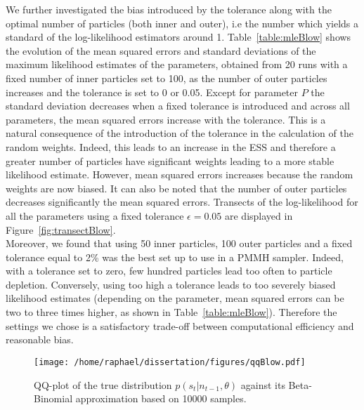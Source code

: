\documentclass[12pt]{article}
\begin{document}
	We further investigated the bias introduced by the tolerance along with the optimal number of particles (both inner and outer), i.e the number which yields a standard of the log-likelihood estimators around 1. Table~\ref{table:mleBlow} shows the evolution of the mean squared errors and standard deviations of the maximum likelihood estimates of the parameters, obtained from 20 runs with a fixed number of inner particles set to 100, as the number of outer particles increases and the tolerance is set to 0 or 0.05. Except for parameter $P$ the standard deviation decreases when a fixed tolerance is introduced and across all parameters, the mean squared errors increase with the tolerance. This is a natural consequence of the introduction of the tolerance in the calculation of the random weights. Indeed, this leads to an increase in the ESS and therefore a greater number of particles have significant weights leading to a more stable likelihood estimate. However, mean squared errors increases because the random weights are now biased. It can also be noted that the number of outer particles decreases significantly the mean squared errors.
	Transects of the log-likelihood for all the parameters using a fixed tolerance $\epsilon=0.05$ are displayed in Figure~\ref{fig:transectBlow}. \\
	Moreover, we found that using 50 inner particles, 100 outer particles and a fixed tolerance equal to 2\% was the best set up to use in a PMMH sampler. Indeed, with a tolerance set to zero, few hundred particles lead too often to particle depletion. Conversely, using too high a tolerance leads to too severely biased likelihood estimates (depending on the parameter, mean squared errors can be two to three times higher, as shown in Table~\ref{table:mleBlow}). Therefore the settings we chose is a satisfactory trade-off between computational efficiency and reasonable bias.

	\begin{figure}[htb]
		\centering
		\begin{minipage}{0.9\textwidth}
			\centering
			\texttt{[image: /home/raphael/dissertation/figures/qqBlow.pdf]}
		\end{minipage}
		\caption[QQ-plot of the true distribution $p(s_t | n_{t-1}, \theta)$ against its Beta-Binomial approximation.]{QQ-plot of the true distribution $p(s_t | n_{t-1}, \theta)$ against its Beta-Binomial approximation based on 10000 samples.}
		\label{fig:qqBlow}
	\end{figure}
\end{document}
